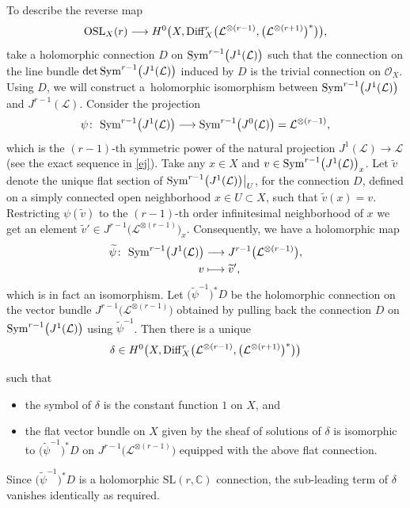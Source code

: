 \documentclass[10pt,a4paper]{amsart}
\numberwithin{equation}{section}
\begin{document}
To describe the reverse map
\begin{equation}\label{z1b}
{\rm OSL}_X(r) \longrightarrow H^0\bigl(X, {\rm Diff}^r_X
\bigl({\mathcal L}^{\otimes (r-1)}, \bigl({\mathcal L}^{\otimes (r+1)}\bigr)^*\bigr)\bigr),
\end{equation}
take a holomorphic connection $D$ on ${\rm Sym}^{r-1}\bigl(J^1(\mathcal
L)\bigr)$ such that the connection on the line bundle $\det {\rm Sym}^{r-1}\bigl(J^1(\mathcal L)\bigr)$ induced by $D$ is
the trivial connection on ${\mathcal O}_X$. Using $D$, we will construct a~holomorphic
isomorphism between ${\rm Sym}^{r-1}\bigl(J^1(\mathcal L)\bigr)$ and $J^{r-1}(\mathcal L)$. Consider
the projection
\[
\psi\colon\ {\rm Sym}^{r-1}\bigl(J^1(\mathcal L)\bigr) \longrightarrow {\rm Sym}^{r-1}\bigl(J^0(\mathcal L)\bigr) =
{\mathcal L}^{\otimes (r-1)},
\]
which is the $(r-1)$-th symmetric power of the natural projection $J^1(\mathcal L)
\longrightarrow \mathcal L$ (see the exact sequence in \eqref{ej}). Take any $x \in X$ and $v \in {\rm
Sym}^{r-1}\bigl(J^1(\mathcal L)\bigr)_x$. Let $\widetilde{v}$ denote the unique flat section of ${\rm
Sym}^{r-1}\bigl(J^1(\mathcal L)\bigr)\big\vert_U$, for the connection $D$, defined on a simply
connected open neighborhood $x \in U \subset X$, such that $\widetilde{v}(x) =
v$. Restricting $\psi(\widetilde{v})$ to the $(r-1)$-th order infinitesimal neighborhood of
$x$ we get an element $\widetilde{v}' \in J^{r-1}\bigl({\mathcal L}^{\otimes (r-1)}\bigr)_x$.
Consequently, we have a holomorphic map
\begin{align}
\widetilde{\psi}\colon\ {\rm Sym}^{r-1}\bigl(J^1(\mathcal L)\bigr) & \longrightarrow J^{r-1}\bigl({\mathcal L}^{\otimes (r-1)}\bigr),\nonumber\\
v& \longmapsto \widetilde{v}',\label{psn}
\end{align}
which is in fact an isomorphism. Let $\bigl(\widetilde{\psi}^{-1}\bigr)^*D$
be the holomorphic connection on the vector bundle $J^{r-1}\bigl({\mathcal L}^{\otimes (r-1)}\bigr)$ obtained by pulling
back the connection $D$ on ${\rm Sym}^{r-1}\bigl(J^1(\mathcal L)\bigr)$ using $\widetilde{\psi}^{-1}$.
Then there is a unique
\begin{equation}\label{a2}
\delta \in H^0\bigl(X, {\rm Diff}^r_X\bigl({\mathcal L}^{\otimes (r-1)},
\bigl({\mathcal L}^{\otimes (r+1)}\bigr)^*\bigr)\bigr)
\end{equation}
{\samepage such that
\begin{itemize}\itemsep=0pt
\item the symbol of $\delta$ is the constant function $1$ on $X$, and

\item the flat vector bundle on $X$ given by the sheaf of solutions of $\delta$ is isomorphic
to $\bigl(\widetilde{\psi}^{-1}\bigr)^*D$ on $J^{r-1}\bigl({\mathcal L}^{\otimes (r-1)}\bigr)$ equipped with the above
flat connection.
\end{itemize}}
Since $\bigl(\widetilde{\psi}^{-1}\bigr)^*D$ is a holomorphic $\text{SL}(r,{\mathbb C})$ connection, the
sub-leading term of $\delta$ vanishes identically as required.
\end{document}
